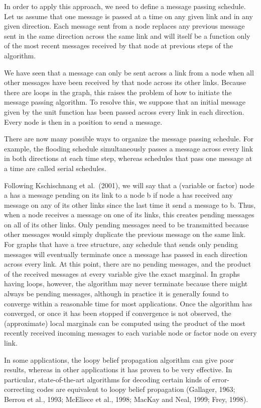 \documentclass[
  10
]{article}
\begin{document}
In order to apply this approach, we need to define a message passing
schedule. Let us assume that one message is passed at a time on any
given link and in any given direction. Each message sent from a node
replaces any previous message sent in the same direction across the same
link and will itself be a function only of the most recent messages
received by that node at previous steps of the algorithm.

We have seen that a message can only be sent across a link from a node
when all other messages have been received by that node across its other
links. Because there are loops in the graph, this raises the problem of
how to initiate the message passing algorithm. To resolve this, we
suppose that an initial message given by the unit function has been
passed across every link in each direction. Every node is then in a
position to send a message.

There are now many possible ways to organize the message passing
schedule. For example, the flooding schedule simultaneously passes a
message across every link in both directions at each time step, whereas
schedules that pass one message at a time are called serial schedules.

Following Kschischnang et al.~(2001), we will say that a (variable or
factor) node a has a message pending on its link to a node b if node a
has received any message on any of its other links since the last time
it send a message to b. Thus, when a node receives a message on one of
its links, this creates pending messages on all of its other links. Only
pending messages need to be transmitted because other messages would
simply duplicate the previous message on the same link. For graphs that
have a tree structure, any schedule that sends only pending messages
will eventually terminate once a message has passed in each direction
across every link. At this point, there are no pending messages, and the
product of the received messages at every variable give the exact
marginal. In graphs having loops, however, the algorithm may never
terminate because there might always be pending messages, although in
practice it is generally found to converge within a reasonable time for
most applications. Once the algorithm has converged, or once it has been
stopped if convergence is not observed, the (approximate) local
marginals can be computed using the product of the most recently
received incoming messages to each variable node or factor node on every
link.

In some applications, the loopy belief propagation algorithm can give
poor results, whereas in other applications it has proven to be very
effective. In particular, state-of-the-art algorithms for decoding
certain kinds of error-correcting codes are equivalent to loopy belief
propagation (Gallager, 1963; Berrou et al., 1993; McEliece et al., 1998;
MacKay and Neal, 1999; Frey, 1998).
\end{document}
